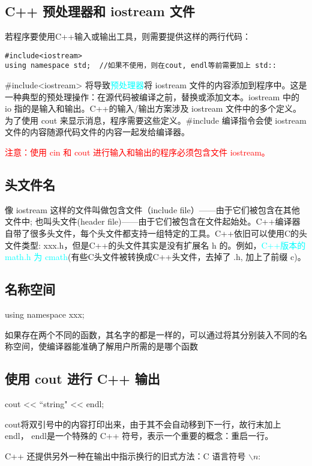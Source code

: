 \documentclass[10pt,a4paper,fleqn]{ctexart}
\begin{document}
\subsection{C++ 预处理器和 iostream 文件}
若程序要使用C++输入或输出工具，则需要提供这样的两行代码：

\begin{verbatim}
#include<iostream>
using namespace std;  //如果不使用，则在cout, endl等前需要加上 std::
\end{verbatim}

\#include<iostream> 将导致\textcolor{cyan}{预处理器}将 iostream 文件的内容添加到程序中。这是一种典型的预处理操作：在源代码被编译之前，替换或添加文本。iostream 中的 io 指的是输入和输出。C++的输入/输出方案涉及 iostream 文件中的多个定义。为了使用 cout 来显示消息，程序需要这些定义。\#include 编译指令会使 iostream 文件的内容随源代码文件的内容一起发给编译器。

\textcolor{red}{注意：使用 cin 和 cout 进行输入和输出的程序必须包含文件 iostream。}

\subsection{头文件名}
像 iostream 这样的文件叫做包含文件（include file）——由于它们被包含在其他文件中; 也叫\textcolor{-red}{头文件(header file)}——由于它们被包含在文件起始处。C++编译器自带了很多头文件，每个头文件都支持一组特定的工具。C++依旧可以使用C的头文件类型: xxx.h，但是C++的头文件其实是没有扩展名 h 的。例如，\textcolor{cyan}{C++版本的 math.h 为 cmath}(有些C头文件被转换成C++头文件，去掉了 .h, 加上了前缀 c)。

\subsection{名称空间}
using namespace xxx;

如果存在两个不同的函数，其名字的都是一样的，可以通过将其分别装入不同的名称空间，使编译器能准确了解用户所需的是哪个函数

\subsection{使用 cout 进行 C++ 输出}
cout << ``string" << endl;

cout将双引号中的内容打印出来，由于其不会自动移到下一行，故行末加上 endl， endl是一个特殊的 C++ 符号，表示一个重要的概念：重启一行。

C++ 还提供另外一种在输出中指示换行的旧式方法：C 语言符号 $\backslash n$:
\end{document}
